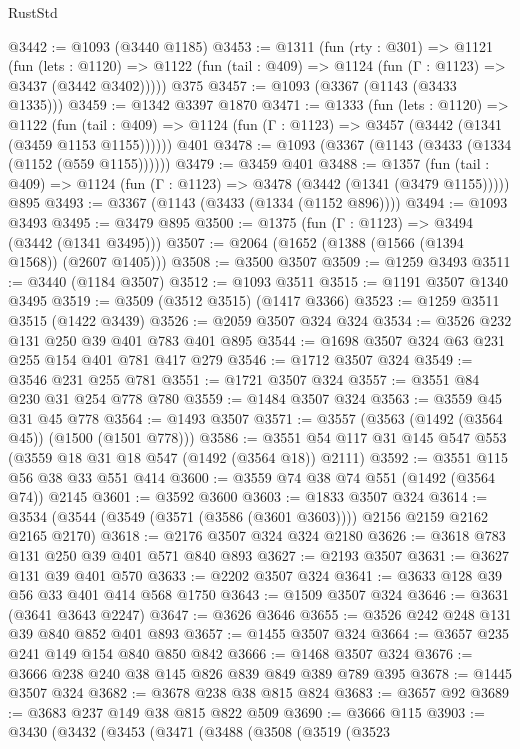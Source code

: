\begin{lexlean}{RustStd}
\begin{coremodule}
@3442 := @1093 (@3440 @1185)
@3453 := @1311
    (fun (rty : @301) =>
    @1121
      (fun (lets : @1120) =>
      @1122 (fun (tail : @409) => @1124 (fun (Γ : @1123) => @3437 (@3442 @3402)))))
    @375
@3457 := @1093 (@3367 (@1143 (@3433 @1335)))
@3459 := @1342 @3397 @1870
@3471 := @1333
    (fun (lets : @1120) =>
    @1122
      (fun (tail : @409) => @1124 (fun (Γ : @1123) => @3457 (@3442 (@1341 (@3459 @1153 @1155))))))
    @401
@3478 := @1093 (@3367 (@1143 (@3433 (@1334 (@1152 (@559 @1155))))))
@3479 := @3459 @401
@3488 := @1357
    (fun (tail : @409) => @1124 (fun (Γ : @1123) => @3478 (@3442 (@1341 (@3479 @1155)))))
    @895
@3493 := @3367 (@1143 (@3433 (@1334 (@1152 @896))))
@3494 := @1093 @3493
@3495 := @3479 @895
@3500 := @1375 (fun (Γ : @1123) => @3494 (@3442 (@1341 @3495)))
@3507 := @2064 (@1652 (@1388 (@1566 (@1394 @1568)) (@2607 @1405)))
@3508 := @3500 @3507
@3509 := @1259 @3493
@3511 := @3440 (@1184 @3507)
@3512 := @1093 @3511
@3515 := @1191 @3507 @1340 @3495
@3519 := @3509 (@3512 @3515) (@1417 @3366)
@3523 := @1259 @3511 @3515 (@1422 @3439)
@3526 := @2059 @3507 @324 @324
@3534 := @3526 @232 @131 @250 @39 @401 @783 @401 @895
@3544 := @1698 @3507 @324 @63 @231 @255 @154 @401 @781 @417 @279
@3546 := @1712 @3507 @324
@3549 := @3546 @231 @255 @781
@3551 := @1721 @3507 @324
@3557 := @3551 @84 @230 @31 @254 @778 @780
@3559 := @1484 @3507 @324
@3563 := @3559 @45 @31 @45 @778
@3564 := @1493 @3507
@3571 := @3557 (@3563 (@1492 (@3564 @45)) (@1500 (@1501 @778)))
@3586 := @3551 @54 @117 @31 @145 @547 @553 (@3559 @18 @31 @18 @547 (@1492 (@3564 @18)) @2111)
@3592 := @3551 @115 @56 @38 @33 @551 @414
@3600 := @3559 @74 @38 @74 @551 (@1492 (@3564 @74)) @2145
@3601 := @3592 @3600
@3603 := @1833 @3507 @324
@3614 := @3534 (@3544 (@3549 (@3571 (@3586 (@3601 @3603)))) @2156 @2159 @2162 @2165 @2170)
@3618 := @2176 @3507 @324 @324 @2180
@3626 := @3618 @783 @131 @250 @39 @401 @571 @840 @893
@3627 := @2193 @3507
@3631 := @3627 @131 @39 @401 @570
@3633 := @2202 @3507 @324
@3641 := @3633 @128 @39 @56 @33 @401 @414 @568 @1750
@3643 := @1509 @3507 @324
@3646 := @3631 (@3641 @3643 @2247)
@3647 := @3626 @3646
@3655 := @3526 @242 @248 @131 @39 @840 @852 @401 @893
@3657 := @1455 @3507 @324
@3664 := @3657 @235 @241 @149 @154 @840 @850 @842
@3666 := @1468 @3507 @324
@3676 := @3666 @238 @240 @38 @145 @826 @839 @849 @389 @789 @395
@3678 := @1445 @3507 @324
@3682 := @3678 @238 @38 @815 @824
@3683 := @3657 @92
@3689 := @3683 @237 @149 @38 @815 @822 @509
@3690 := @3666 @115
@3903 := @3430
    (@3432
      (@3453
        (@3471
          (@3488
            (@3508
              (@3519
                (@3523

\end{coremodule}
\end{lexlean}
